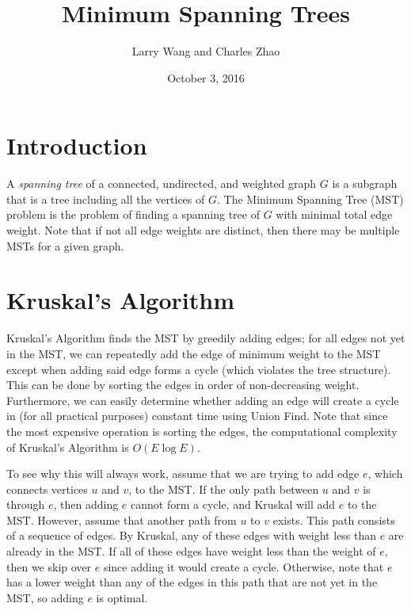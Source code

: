 \documentclass[11pt]{article}
\title{Minimum Spanning Trees}
\author{Larry Wang and Charles Zhao}
\date{October 3, 2016}
\begin{document}
\maketitle

\section{Introduction}
A \textit{spanning tree} of a connected, undirected, and weighted graph $G$ is a subgraph that is a tree including all the vertices of $G$. The Minimum Spanning Tree (MST) problem is the problem of finding a spanning tree of $G$ with minimal total edge weight. Note that if not all edge weights are distinct, then there may be multiple MSTs for a given graph.

\begin{center}
\end{center}

\section{Kruskal's Algorithm}

Kruskal's Algorithm finds the MST by greedily adding edges; for all edges not yet in the MST, we can repeatedly add the edge of minimum weight to the MST except when adding said edge forms a cycle (which violates the tree structure). This can be done by sorting the edges in order of non-decreasing weight. Furthermore, we can easily determine whether adding an edge will create a cycle in (for all practical purposes) constant time using Union Find. Note that since the most expensive operation is sorting the edges, the computational complexity of Kruskal's Algorithm is $O(E \log E)$. 

To see why this will always work, assume that we are trying to add edge $e$, which connects vertices $u$ and $v$, to the MST. If the only path between $u$ and $v$ is through $e$, then adding $e$ cannot form a cycle, and Kruskal will add $e$ to the MST. However, assume that another path from $u$ to $v$ exists. This path consists of a sequence of edges. By Kruskal, any of these edges with weight less than $e$ are already in the MST. If all of these edges have weight less than the weight of $e$, then we skip over $e$ since adding it would create a cycle. Otherwise, note that $e$ has a lower weight than any of the edges in this path that are not yet in the MST, so adding $e$ is optimal.
\end{document}
